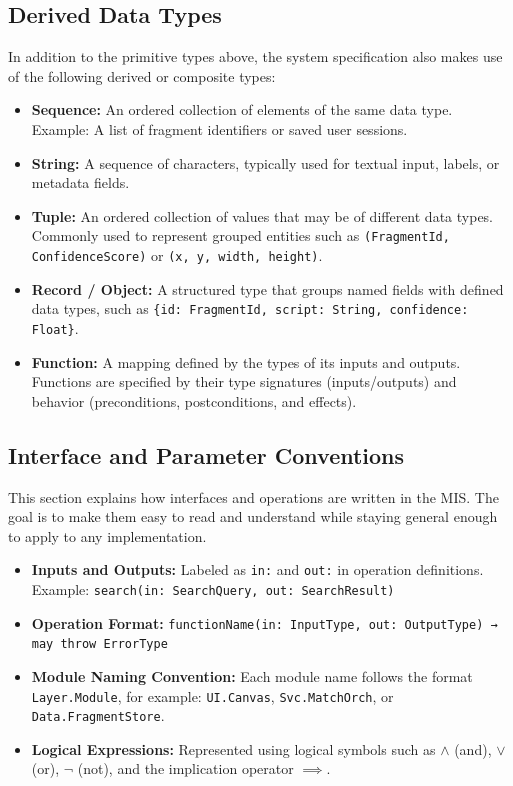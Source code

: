 \documentclass[12pt, titlepage]{article}
\begin{document}
\subsection{Derived Data Types}

In addition to the primitive types above, the system specification also makes use of the following derived or composite types:

\begin{itemize}
    \item \textbf{Sequence:} An ordered collection of elements of the same data type. Example: A list of fragment identifiers or saved user sessions.
    \item \textbf{String:} A sequence of characters, typically used for textual input, labels, or metadata fields.
    \item \textbf{Tuple:} An ordered collection of values that may be of different data types. Commonly used to represent grouped entities such as \texttt{(FragmentId, ConfidenceScore)} or \texttt{(x, y, width, height)}.
    \item \textbf{Record / Object:} A structured type that groups named fields with defined data types, such as \texttt{\{id: FragmentId, script: String, confidence: Float\}}.
    \item \textbf{Function:} A mapping defined by the types of its inputs and outputs. Functions are specified by their type signatures (inputs/outputs) and behavior (preconditions, postconditions, and effects).
\end{itemize}

\subsection{Interface and Parameter Conventions}

This section explains how interfaces and operations are written in the MIS. The goal is to make them easy to read and understand while staying general enough to apply to any implementation.

\begin{itemize}
    \item \textbf{Inputs and Outputs:} Labeled as \texttt{in:} and \texttt{out:} in operation definitions. Example: \texttt{search(in: SearchQuery, out: SearchResult)}
    \item \textbf{Operation Format:} \texttt{functionName(in: InputType, out: OutputType) → may throw ErrorType}
    \item \textbf{Module Naming Convention:} Each module name follows the format \texttt{Layer.Module}, for example: \texttt{UI.Canvas}, \texttt{Svc.MatchOrch}, or \texttt{Data.FragmentStore}.
    \item \textbf{Logical Expressions:} Represented using logical symbols such as $\land$ (and), $\lor$ (or), $\lnot$ (not), and the implication operator $\implies$.
\end{itemize}
\end{document}
